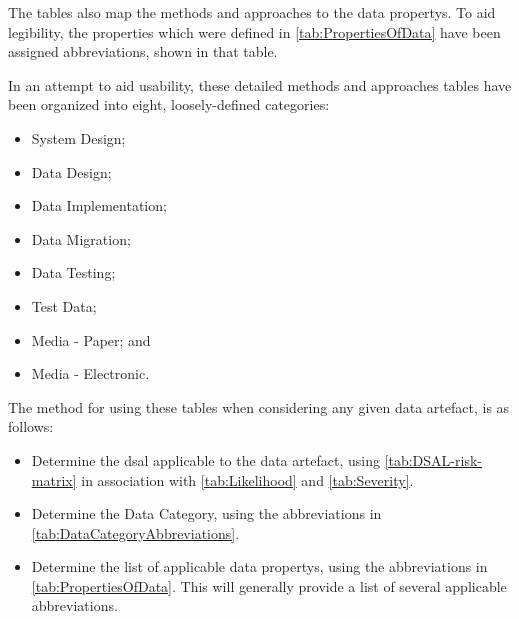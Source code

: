 The tables also map the methods and approaches to the \glspl{data property}. To aid legibility, the properties
which were defined in \autoref{tab:PropertiesOfData} have been assigned abbreviations\cbstart, shown in that table.\cbend

In an attempt to aid usability, these detailed methods and approaches tables have been organized into eight, loosely-defined categories:
\begin{itemize}
  \item System Design;
  \item Data Design;
  \item Data Implementation;
  \item Data Migration;
  \item Data Testing;
  \item Test Data;
  \item Media - Paper; and 
  \item Media - Electronic.
\end{itemize}

The method for using these tables when considering any given \gls{data artefact}, is as follows:
\begin{itemize}
    \item Determine the \gls{dsal} applicable to the \cbstart\gls{data artefact}\cbend, using \autoref{tab:DSAL-risk-matrix} in association with \autoref{tab:Likelihood} and \autoref{tab:Severity}.
    \item Determine the Data Category, using the abbreviations in \autoref{tab:DataCategoryAbbreviations}.
    \item Determine the list of applicable \glspl{data property}, using the abbreviations in \autoref{tab:PropertiesOfData}. This will generally provide a list of several applicable abbreviations.
\end{itemize}

